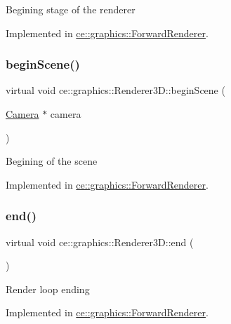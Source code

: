 Begining stage of the renderer 

Implemented in \hyperlink{classce_1_1graphics_1_1_forward_renderer_a4550120dc1349b5298de4a02422c6c26}{ce\+::graphics\+::\+Forward\+Renderer}.

\mbox{\label{classce_1_1graphics_1_1_renderer3_d_a94e60931e0ff3f26b217db09a11ee7e6}} 
\subsubsection{\texorpdfstring{begin\+Scene()}{beginScene()}}
{\footnotesize\ttfamily virtual void ce\+::graphics\+::\+Renderer3\+D\+::begin\+Scene (\begin{DoxyParamCaption}\item[{\hyperlink{classce_1_1graphics_1_1_camera}{Camera} $\ast$}]{camera }\end{DoxyParamCaption})\hspace{0.3cm}{\ttfamily [pure virtual]}}

Begining of the scene 

Implemented in \hyperlink{classce_1_1graphics_1_1_forward_renderer_ae84dbf0b5a71b464cf4fc34a5daac805}{ce\+::graphics\+::\+Forward\+Renderer}.

\mbox{\label{classce_1_1graphics_1_1_renderer3_d_a4d35e07f42a4fb42ebe3f8e57bfcdb58}} 
\subsubsection{\texorpdfstring{end()}{end()}}
{\footnotesize\ttfamily virtual void ce\+::graphics\+::\+Renderer3\+D\+::end (\begin{DoxyParamCaption}{ }\end{DoxyParamCaption})\hspace{0.3cm}{\ttfamily [pure virtual]}}

Render loop ending 

Implemented in \hyperlink{classce_1_1graphics_1_1_forward_renderer_a8a8c16a645e63fd54b932f62d96d805b}{ce\+::graphics\+::\+Forward\+Renderer}.

